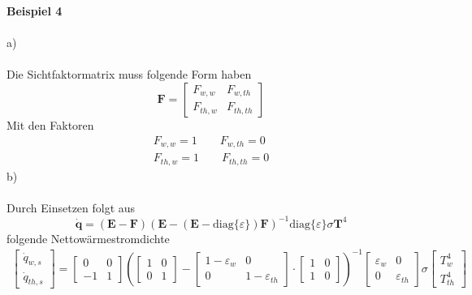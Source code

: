 \textbf{Beispiel 4}\\ \\
a)\\ \\
Die Sichtfaktormatrix muss folgende Form haben
\[
	\textbf{F} = \begin{bmatrix}
		F_{w,w} & F_{w,th} \\
		F_{th,w} & F_{th,th}
	\end{bmatrix}
\]
Mit den Faktoren
\begin{align*}
	F_{w,w} = 1 \qquad F_{w,th} = 0 \\
	F_{th,w} = 1  \qquad F_{th,th} = 0
\end{align*}
b)\\ \\
Durch Einsetzen folgt aus
\[
	\dot{\textbf{q}} = (\textbf{E} - \textbf{F})(\textbf{E} - (\textbf{E} - \text{diag}\{\varepsilon\})\textbf{F})^{-1}\text{diag}\{\varepsilon\}\sigma\textbf{T}^4
\]
folgende Nettowärmestromdichte
\begin{align*}
	\begin{bmatrix}
		\dot{q}_{w,s} \\
		\dot{q}_{th,s}
	\end{bmatrix}
	=
	\begin{bmatrix}
		0 & 0 \\
		-1 & 1
	\end{bmatrix}
	 \left(
	 	\begin{bmatrix}
	 		1 & 0 \\
	 		0 & 1
	 	\end{bmatrix}
	 	-
	 	\begin{bmatrix}
	 		1 - \varepsilon_w & 0 \\
	 		0 & 1 - \varepsilon_{th}
	 	\end{bmatrix}
	 	\cdot
	 	\begin{bmatrix}
	 		1 & 0 \\
	 		1 & 0
	 	\end{bmatrix}
	 \right)^{-1}
	 \begin{bmatrix}
	 	\varepsilon_w & 0 \\
	 	0 & \varepsilon_{th}
	 \end{bmatrix}
	 \sigma\begin{bmatrix}
	 	T_w^4 \\
	 	T_{th}^4
	 \end{bmatrix}
\end{align*}
\newpage
\noindent
